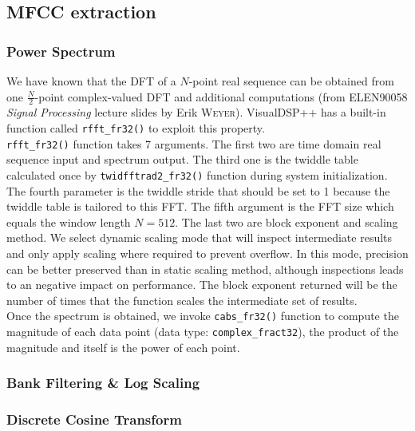 \subsection{MFCC extraction}
\subsubsection{Power Spectrum}

We have known that the DFT of a $N$-point real sequence can be obtained from one $\frac{N}{2}$-point complex-valued DFT and additional computations (from ELEN90058 \textit{Signal Processing} lecture slides by Erik \textsc{Weyer}). VisualDSP++ has a built-in function called \texttt{rfft\_fr32()} to exploit this property.\\

\texttt{rfft\_fr32()} function takes 7 arguments. The first two are time domain real sequence input and spectrum output. The third one is the twiddle table calculated once by \texttt{twidfftrad2\_fr32()} function during system initialization. The fourth parameter is the twiddle stride that should be set to 1 because the twiddle table is tailored to this FFT. The fifth argument is the FFT size which equals the window length $N = 512$. The last two are block exponent and scaling method. We select dynamic scaling mode that will inspect intermediate results and only apply scaling where required to prevent overflow. In this mode, precision can be better preserved than in static scaling method, although inspections leads to an negative impact on performance. The block exponent returned will be the number of times that the function scales the intermediate set of results.\\

Once the spectrum is obtained, we invoke \texttt{cabs\_fr32()} function to compute the magnitude of each data point (data type: \texttt{complex\_fract32}), the product of the magnitude and itself is the power of each point.


\subsubsection{Bank Filtering \& Log Scaling}


\subsubsection{Discrete Cosine Transform}

